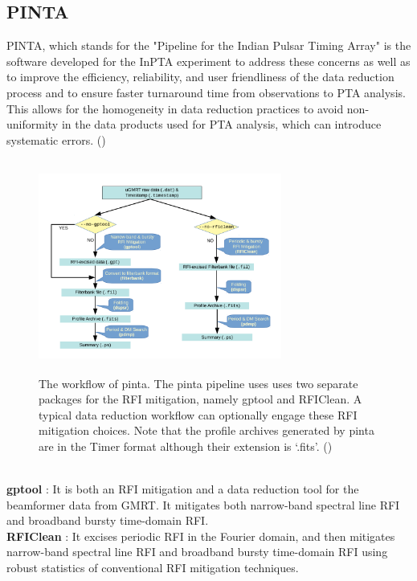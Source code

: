 \documentclass{article}
\begin{document}
\subsection{PINTA}
PINTA, which stands for the "Pipeline for the Indian Pulsar Timing Array" is the software developed for the InPTA experiment to address these concerns as well as to improve the efficiency, reliability, and user friendliness of the data reduction process and to ensure faster turnaround time from observations to PTA analysis.  This allows for the homogeneity in data reduction practices to avoid non-uniformity in the data products used for PTA analysis, which can introduce systematic errors. (\cite{Susobhanan+2021})
\begin{figure}[htbp]
\begin{center}
\includegraphics[height=7cm,width=8cm]{Images/Pulsar4.png}
\caption{The workflow of pinta. The pinta pipeline uses uses two separate packages for the RFI mitigation, namely gptool and RFIClean. A typical data reduction workflow can optionally engage these RFI mitigation choices. Note that the profile archives generated by pinta are in the Timer format although their extension is ‘.fits’. (\cite{Hotan+2004})}
\end{center}
\end{figure}
\\\textbf{gptool} : It is both an RFI mitigation and a data reduction tool for the beamformer data from GMRT. It mitigates both narrow-band spectral line RFI and broadband bursty time-domain RFI.
\\\textbf{RFIClean} : It  excises periodic RFI in the Fourier domain, and then mitigates narrow-band spectral line RFI and broadband bursty time-domain RFI using robust statistics of conventional RFI mitigation techniques.
\end{document}
